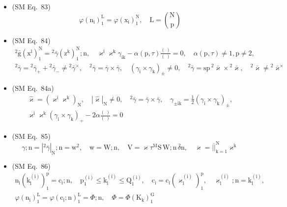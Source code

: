 \documentclass[12pt]{article}
\begin{document}
\begin{itemize}[label={},leftmargin=0pt]
    \item (SM Eq.\ 83) 
    \[
    \varphi(\mathrm{n_i})_1^\mathrm{L} = \varphi(\mathrm{x_i})_1^\mathrm{N}, \quad \mathrm{L} = \binom{\mathrm{N}}{\mathrm{p}}
    \]

    \item (SM Eq.\ 84) 
    \[
    \begin{gathered}
    {}^2\bar{\mathrm{g}}\left( \mathrm{x^l} \right)_1^\mathrm{N} = {}^2\bar{\gamma}\left( \mathrm{z^k} \right)_1^\mathrm{N};\mathrm{n}, \quad \varkappa^\mathrm{i} \varkappa^\mathrm{k} \gamma_{\mathrm{ik}} - \alpha(\mathrm{p}, \tau)\frac{(\ )}{(\ )} = 0, \quad \alpha(\mathrm{p}, \tau) \ne 1, \mathrm{p} \ne 2, \\
    {}^2\bar{\gamma} = {}^2\bar{\gamma}_+ + {}^2\bar{\gamma}_- \ne {}^2\bar{\gamma}^\times, \quad {}^2\bar{\gamma} = \bar{\gamma} \times \bar{\gamma}, \quad (\gamma_\mathrm{i} \times \gamma_\mathrm{k})_\pm \ne 0, \quad {}^2\bar{\gamma} = \mathrm{sp}\,{}^2\bar{\varkappa} \times {}^2\bar{\varkappa}, \quad {}^2\bar{\varkappa} \ne {}^2\bar{\varkappa}^\times
    \end{gathered}
    \]

    \item (SM Eq.\ 84a) 
    \[
    \begin{gathered}
    \hat{\varkappa} = \left( \varkappa^\mathrm{i} \varkappa^\mathrm{k} \right)_\mathrm{N}, \quad \left|\hat{\varkappa}\right|_\mathrm{N} \ne 0, \quad {}^2\bar{\gamma} = \bar{\gamma} \times \bar{\gamma}, \quad \gamma_{\pm \mathrm{ik}} = \frac{1}{2} \left(\gamma_\mathrm{i} \times \gamma_\mathrm{k}\right)_\pm, \\
    \varkappa^\mathrm{i} \varkappa^\mathrm{k} \left(\gamma_\mathrm{i} \times \gamma_\mathrm{k}\right)_+ - 2\alpha \frac{(\ )}{(\ )} = 0
    \end{gathered}
    \]

    \item (SM Eq.\ 85) 
    \[
    \gamma;\mathrm{n} = \left|{}^2\bar{\gamma}\right|_\mathrm{N};\mathrm{n} = \mathrm{w}^2, \quad \mathrm{w} = \mathrm{W};\mathrm{n}, \quad \mathrm{V} = \varkappa \tau^\mathrm{M} \mathrm{S}\,\mathrm{W};\mathrm{n}\,\bar{\delta}\mathrm{n}, \quad \varkappa = \overline{||}_{\mathrm{k}=1}^\mathrm{N} \varkappa^\mathrm{k}
    \]

    \item (SM Eq.\ 86) 
    \[
    \begin{gathered}
    \mathrm{n_i} \left( \mathrm{k_l^{(i)}} \right)_1^\mathrm{p} = \mathrm{c_i};\mathrm{n}, \quad \mathrm{p_1^{(i)}} \le \mathrm{k_l^{(i)}} \le \mathrm{Q_1^{(i)}}, \quad \mathrm{c_i} = \mathrm{c_i} \left( \varkappa_\mathrm{l}^{\mathrm{(i)}} \right)_1^\mathrm{p}, \quad \varkappa_\mathrm{l}^{\mathrm{(i)}};\mathrm{n} = \mathrm{k_l^{(i)}}, \\
    \varphi(\mathrm{n_i})_1^\mathrm{L} = \varphi(\mathrm{c_i};\mathrm{n})_1^\mathrm{L} = \Phi;\mathrm{n}, \quad \Phi = \Phi(\mathrm{K_k})_1^\mathrm{G}
    \end{gathered}
    \]


\end{itemize}
\end{document}
